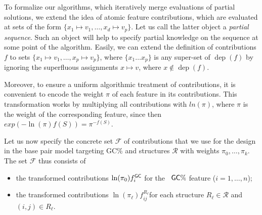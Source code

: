 \documentclass[]{bmcart}
\newtheorem{definition}[theorem]{Definition}
\newcommand{\network}{\mathcal{N}}
\newcommand{\dep}{\operatorname{dep}}
\newcommand{\real}{\mathbb{R}}
\newcommand{\F}{\mathcal{F}}
\newcommand{\R}{\mathcal{R}}
\newcommand{\X}{\mathcal{X}}
\newcommand{\Def}[1]{\emph{#1}}
\newcommand{\Nuc}[1]{{\sf #1}}
\newcommand{\Cb}{\Nuc{C}}
\newcommand{\Gb}{\Nuc{G}}
\newcommand{\GCb}{\Gb\Cb}
\newcommand{\revised}[1]{{\color{red} #1}}
\begin{document}
To formalize our algorithms, which iteratively merge evaluations of partial solutions, we extend the idea of atomic feature contributions, which are evaluated at sets of the form $\{x_1\mapsto v_1, \dots, x_d\mapsto v_p\}$. Let us call the latter object a \Def{partial sequence}. Such an object will help \revised{to} specify partial knowledge on the sequence at some point of the algorithm. Easily, we can extend the definition of contributions $f$ to sets $\{x_1\mapsto v_1, \dots, x_p\mapsto v_p\}$, where $\{x_1\dots x_p\}$ is any super-set of $\dep(f)$ by ignoring the superfluous assignments $x\mapsto v$, where $x\not\in\dep(f)$. 

%


Moreover, to ensure a uniform algorithmic treatment of contributions, it is convenient to encode the weight $\pi$ of each feature in its contributions. This transformation works by multiplying all contributions with $ln(\pi)$, where $\pi$ is the weight of the corresponding feature, since then
$exp(-\ln(\pi)f(S))=\pi^{-f(S)}.$

%
Let us now specify the concrete set $\F$ of contributions that we use
for the design in the base pair model targeting \GCb\% and structures $\R$ with weights $\pi_0,\dots,\pi_k$. The set $\F$ thus consists of
\begin{itemize}
\item the transformed contributions $\ln(\pi_0)f^{\GCb}_i$ for the ~$\GCb\%$ feature ($i=1,\dots,n$);
\item the transformed contributions $\ln(\pi_\ell)f^{R_\ell}_{ij}$for each structure $R_\ell\in\R$ and $(i,j)\in R_\ell.$
\end{itemize}
\end{document}
